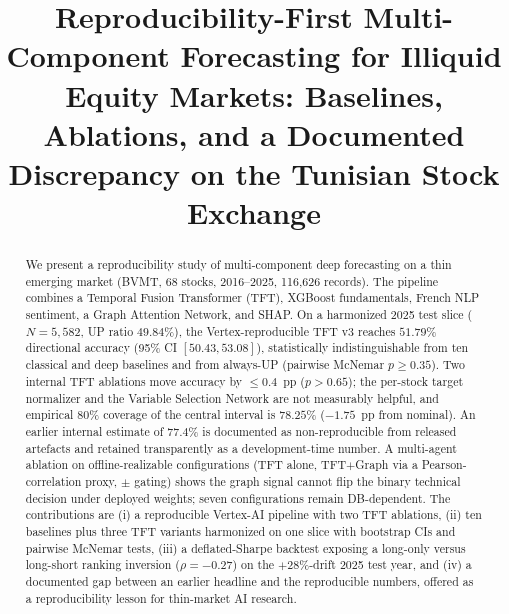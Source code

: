\documentclass[conference]{IEEEtran}
\begin{document}
\title{Reproducibility-First Multi-Component Forecasting for Illiquid Equity Markets: Baselines, Ablations, and a Documented Discrepancy on the Tunisian Stock Exchange}

\author{
\and
{}
}

\maketitle

\begin{abstract}
We present a reproducibility study of multi-component deep forecasting on a thin emerging market (BVMT, 68 stocks, 2016--2025, 116{,}626 records). The pipeline combines a Temporal Fusion Transformer (TFT), XGBoost fundamentals, French NLP sentiment, a Graph Attention Network, and SHAP. On a harmonized 2025 test slice ($N=5{,}582$, UP ratio $49.84\%$), the Vertex-reproducible TFT v3 reaches $51.79\%$ directional accuracy (95\% CI $[50.43, 53.08]$), statistically indistinguishable from ten classical and deep baselines and from always-UP (pairwise McNemar $p \geq 0.35$). Two internal TFT ablations move accuracy by $\leq 0.4$~pp ($p > 0.65$); the per-stock target normalizer and the Variable Selection Network are not measurably helpful, and empirical $80\%$ coverage of the central interval is $78.25\%$ ($-1.75$~pp from nominal). An earlier internal estimate of $77.4\%$ is documented as non-reproducible from released artefacts and retained transparently as a development-time number. A multi-agent ablation on offline-realizable configurations (TFT alone, TFT$+$Graph via a Pearson-correlation proxy, $\pm$ gating) shows the graph signal cannot flip the binary technical decision under deployed weights; seven configurations remain DB-dependent. The contributions are (i) a reproducible Vertex-AI pipeline with two TFT ablations, (ii) ten baselines plus three TFT variants harmonized on one slice with bootstrap CIs and pairwise McNemar tests, (iii) a deflated-Sharpe backtest exposing a long-only versus long-short ranking inversion ($\rho=-0.27$) on the $+28\%$-drift 2025 test year, and (iv) a documented gap between an earlier headline and the reproducible numbers, offered as a reproducibility lesson for thin-market AI research.
\end{abstract}
\end{document}
